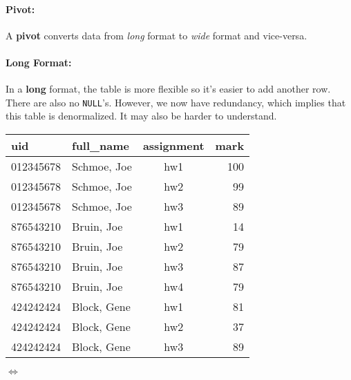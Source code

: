 \documentclass{report}
\newenvironment{example}{\begin{tcolorbox}[title={Example},colback=green!5!white,colframe=black!75!green]}{\end{tcolorbox}}
\renewcommand{\bf}[1]{\textbf{{#1}}}
\renewcommand{\tt}[1]{\texttt{{#1}}}
\renewcommand{\it}[1]{\textit{{#1}}}
\begin{document}
\paragraph{Pivot:} A \bf{pivot} converts data from \it{long} format to \it{wide}
format and vice-versa.
\begin{example}
    \paragraph{Long Format:} In a \bf{long} format, the table is more flexible
    so it's easier to add another row. There are also no \tt{NULL}'s. However,
    we now have redundancy, which implies that this table is denormalized. It
    may also be harder to understand.
    \begin{center}
        \begin{tabular}{l|l|c|r}
            uid & full\_name & assignment & mark \\
            \hline
            012345678 & Schmoe, Joe & hw1 & 100 \\
            012345678 & Schmoe, Joe & hw2 & 99 \\
            012345678 & Schmoe, Joe & hw3 & 89 \\
            876543210 & Bruin, Joe & hw1 & 14 \\
            876543210 & Bruin, Joe & hw2 & 79 \\
            876543210 & Bruin, Joe & hw3 & 87 \\
            876543210 & Bruin, Joe & hw4 & 79 \\
            424242424 & Block, Gene & hw1 & 81 \\
            424242424 & Block, Gene & hw2 & 37 \\
            424242424 & Block, Gene & hw3 & 89 \\
        \end{tabular}
        \vspace{0.5em}

        $\iff$
    \end{center}
    \vspace{-2em}

\end{example}
\end{document}
